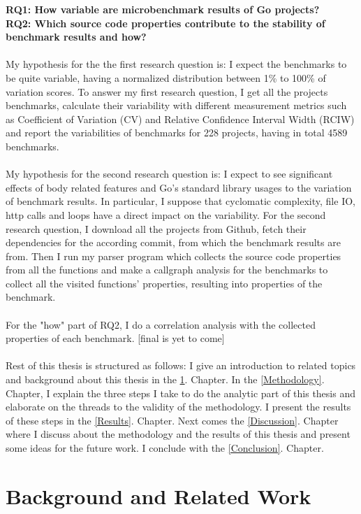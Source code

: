 \documentclass{seal_thesis}
\begin{document}
\textbf{RQ1: How variable are microbenchmark results of Go projects?}\\
\textbf{RQ2: Which source code properties contribute to the stability of benchmark results and how?}\\
\\
My hypothesis for the the first research question is: I expect the benchmarks to be quite variable, having a normalized distribution between 1\% to 100\% of variation scores. To answer my first research question, I get all the projects benchmarks, calculate their variability with different measurement metrics such as Coefficient of Variation (CV) and Relative Confidence Interval Width (RCIW) and report the variabilities of benchmarks for 228 projects, having in total 4589 benchmarks.\\
\\
My hypothesis for the second research question is: I expect to see significant effects of body related features and Go's standard library usages to the variation of benchmark results. In particular, I suppose that cyclomatic complexity, file IO, http calls and loops have a direct impact on the variability. For the second research question, I download all the projects from Github, fetch their dependencies for the according commit, from which the benchmark results are from. Then I run my parser program which collects the source code properties from all the functions and make a callgraph analysis for the benchmarks to collect all the visited functions' properties, resulting into properties of the benchmark.\\
\\
For the "how" part of RQ2, I do a correlation analysis with the collected properties of each benchmark. [final is yet to come]\\
\\ 
Rest of this thesis is structured as follows: I give an introduction to related topics and background about this thesis in the \ref{Background and Related Work}. Chapter. In the \ref{Methodology}. Chapter, I explain the three steps I take to do the analytic part of this thesis and elaborate on the threads to the validity of the methodology. I present the results of these steps in the \ref{Results}. Chapter. Next comes the \ref{Discussion}. Chapter where I discuss about the methodology and the results of this thesis and present some ideas for the future work. I conclude with the \ref{Conclusion}. Chapter.

\chapter{Background and Related Work}
\label{Background and Related Work}
\end{document}
